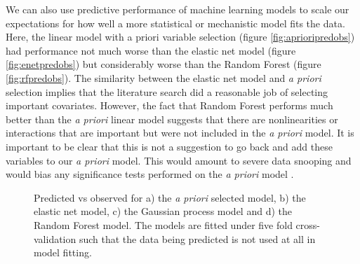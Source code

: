 \documentclass[10pt,]{article}
\begin{document}
We can also use predictive performance of machine learning models to scale our expectations for how well a more statistical or mechanistic model fits the data.
Here, the linear model with a priori variable selection (figure \ref{fig:aprioripredobs}) had performance not much worse than the elastic net model (figure \ref{fig:enetpredobs}) but considerably worse than the Random Forest (figure \ref{fig:rfpredobs}).
The similarity between the elastic net model and \emph{a priori} selection implies that the literature search did a reasonable job of selecting important covariates.
However, the fact that Random Forest performs much better than the \emph{a priori} linear model suggests that there are nonlinearities or interactions that are important but were not included in the \emph{a priori} model.
It is important to be clear that this is not a suggestion to go back and add these variables to our \emph{a priori} model.
This would amount to severe data snooping and would bias any significance tests performed on the \emph{a priori} model \citep{white2000reality}.



\begin{figure}[t!]
  \centering

  \label{fig:predobs}
  \caption{
    Predicted vs observed for a) the \emph{a priori} selected model, b) the elastic net model, c) the Gaussian process model and d) the Random Forest model.
    The models are fitted under five fold cross-validation such that the data being predicted is not used at all in model fitting.
  }
\end{figure}


\end{document}
